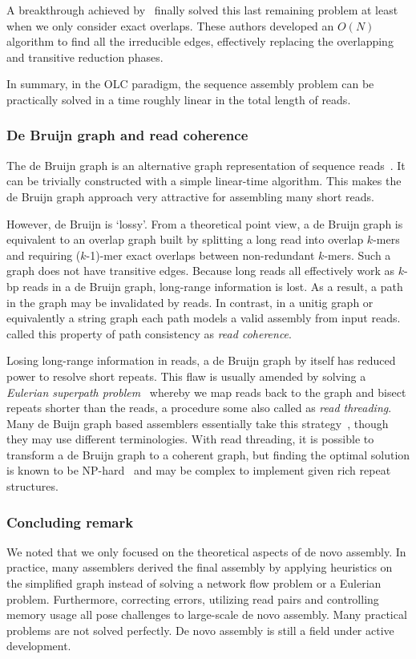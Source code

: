 \documentclass{bioinfo}
\begin{document}
\begin{methods}
A breakthrough achieved by~\citet{Simpson:2010uq} finally solved
this last remaining problem at least when we only consider exact overlaps.
These authors developed an $O(N)$ algorithm to find all the irreducible edges,
effectively replacing the overlapping and transitive reduction phases.

In summary, in the OLC paradigm, the sequence assembly problem can be
practically solved in a time roughly linear in the total length of reads.

\subsubsection{De Bruijn graph and read coherence}
The de Bruijn graph is an alternative graph representation of sequence
reads~\citep{Idury:1995oq}.  It can be trivially constructed with a simple
linear-time algorithm. This makes the de Bruijn graph approach very attractive
for assembling many short reads.

However, de Bruijn is `lossy'. From a theoretical point view, a de Bruijn graph
is equivalent to an overlap graph built by splitting a long read into overlap
$k$-mers and requiring ($k$-1)-mer exact overlaps between non-redundant
$k$-mers.  Such a graph does not have transitive edges. Because long reads all
effectively work as $k$-bp reads in a de Bruijn graph, long-range information
is lost. As a result, a path in the graph may be invalidated by reads. In
contrast, in a unitig graph or equivalently a string graph each path models a
valid assembly from input reads. \citet{Myers:2005bh} called this property of
path consistency as \emph{read coherence}.

Losing long-range information in reads, a de Bruijn graph by itself has
reduced power to resolve short repeats. This flaw is usually amended by solving
a \emph{Eulerian superpath problem}~\citep{Pevzner:2001vn} whereby we
map reads back to the graph and bisect repeats shorter than the reads, a
procedure some also called as \emph{read threading}. Many de Buijn graph based
assemblers essentially take this
strategy~\citep{Chaisson:2009fk,Zerbino:2009ly,Li:2010vn}, though they may use
different terminologies.  With read threading, it is possible to transform a de
Bruijn graph to a coherent graph, but finding the optimal solution is known to be
NP-hard~\citep{DBLP:conf/wabi/MedvedevGMB07} and may be complex to implement
given rich repeat structures.

\subsubsection{Concluding remark}
We noted that we only focused on the theoretical aspects of de novo assembly.
In practice, many assemblers derived the final assembly by applying heuristics
on the simplified graph instead of solving a network flow problem or a Eulerian
problem. Furthermore, correcting errors, utilizing read pairs and controlling memory
usage all pose challenges to large-scale de novo assembly. Many practical
problems are not solved perfectly. De novo assembly is still a field under
active development.


\end{methods}
\end{document}
